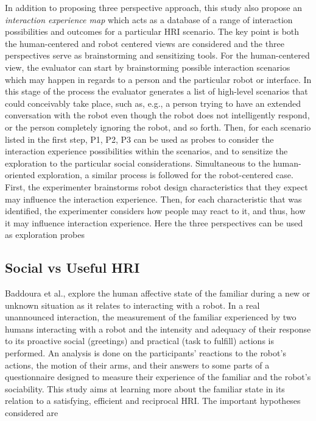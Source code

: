 In addition to proposing three perspective approach, this study also propose an \emph{interaction experience map} which acts as a database of a range of interaction possibilities and outcomes for a particular HRI scenario. The key point is both the human-centered and robot centered views are considered and the three perspectives serve as  brainstorming and sensitizing tools. For the human-centered view, the evaluator can start by brainstorming possible interaction scenarios which may happen in regards to a person and the particular robot or interface. In this stage of the process the evaluator generates a list of high-level scenarios that could conceivably take place, such as, e.g., a person trying to have an extended conversation with the robot even though the robot does not intelligently respond, or the person completely ignoring the robot, and so forth. Then, for each scenario listed in the first step, P1, P2, P3 can be used as probes to consider the interaction experience possibilities within the scenarios, and to sensitize the exploration to the particular social considerations. Simultaneous to the human-oriented exploration, a similar process is followed for the robot-centered case. First, the experimenter brainstorms robot design characteristics that they expect may influence the interaction experience. Then, for each characteristic that was identified, the experimenter considers how people may react to it, and thus, how it may influence interaction experience. Here the three perspectives can be used as exploration probes

\subsection{Social vs Useful HRI}

Baddoura et al.,\cite{Baddoura2013} explore the human affective state of the familiar during a new or unknown situation as it relates to interacting with a robot. In a real unannounced interaction, the measurement of the familiar experienced by two humans interacting with a robot and the intensity and adequacy of their response to its proactive social (greetings) and practical (task to fulfill) actions is performed. An analysis is done on the participants’ reactions to the robot’s actions, the motion of their arms, and their answers to some parts of a questionnaire designed to measure their experience of the familiar and the robot’s sociability. This study aims at learning more about the familiar state in its relation to a satisfying, efficient and reciprocal HRI. The important hypotheses considered are

